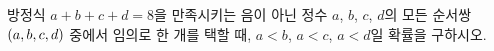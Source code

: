 방정식 $a+b+c+d=8$을 만족시키는 음이 아닌 정수 $a$, $b$, $c$, $d$의 모든 순서쌍 $(a{,}\mkern3mu\mathopen{}b{,}\mkern3mu\mathopen{}c{,}\mkern3mu\mathopen{}d)$ 중에서 임의로 한 개를 택할 때, $a<b$, $a<c$, $a<d$일 확률을 구하시오.
